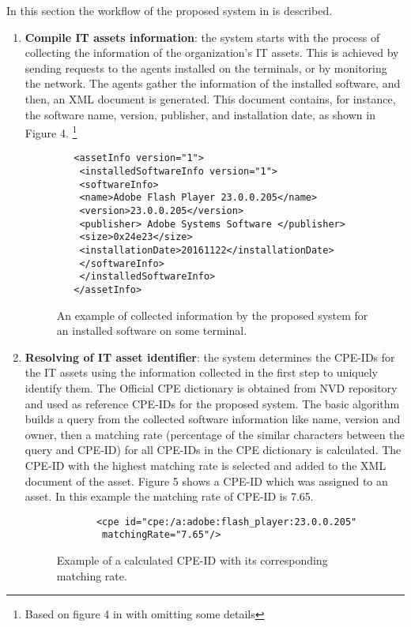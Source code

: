\documentclass{llncs}
\begin{document}
\begin{flushleft}
In this section the workflow of the proposed system in \cite{paper1} is described.
 \end{flushleft}
\begin{enumerate}
 \item \textbf{Compile IT assets information}: the system starts with the process of collecting the information of the organization's IT assets. This is achieved by sending requests to the agents installed on the terminals, or by monitoring the network. The agents gather the information of the installed software, and then, an XML document is generated. This document contains, for instance, the software name, version, publisher, and installation date, as shown in Figure 4.  \footnote{Based on figure 4 in \cite{paper1} with omitting some details} 

 \begin{figure}
 \centering
   \lstset{language=XML}
    \begin{lstlisting}
   <assetInfo version="1">
    <installedSoftwareInfo version="1">
    <softwareInfo>
    <name>Adobe Flash Player 23.0.0.205</name>
    <version>23.0.0.205</version>
    <publisher> Adobe Systems Software </publisher>
    <size>0x24e23</size>
    <installationDate>20161122</installationDate>
    </softwareInfo>
    </installedSoftwareInfo>
   </assetInfo>
    \end{lstlisting}
   \caption{An example of collected information by the proposed system for an installed software on some terminal.}
    \end{figure}
   
   \item \textbf{Resolving of IT asset identifier}: the system determines the CPE-IDs for the IT assets using the information  collected in the first step to uniquely identify them. The Official CPE dictionary is obtained from NVD repository and used as reference CPE-IDs for the proposed system. The basic algorithm builds a query from the collected software information like name, version and owner, then a matching rate (percentage of the similar characters between the query and CPE-ID) for all CPE-IDs in the CPE dictionary is calculated.  The CPE-ID with the highest matching rate is selected and added to the XML document of the asset. Figure 5 shows a CPE-ID which was assigned to an asset. In this example the matching rate of CPE-ID is 7.65.
   
    \begin{figure}
    \centering
      \lstset{language=XML}
       \begin{lstlisting} 
       <cpe id="cpe:/a:adobe:flash_player:23.0.0.205" 
        matchingRate="7.65"/>
       \end{lstlisting}
      \caption{Example of a calculated CPE-ID with its corresponding matching rate.}
       \end{figure}
      

\end{enumerate}
\end{document}
